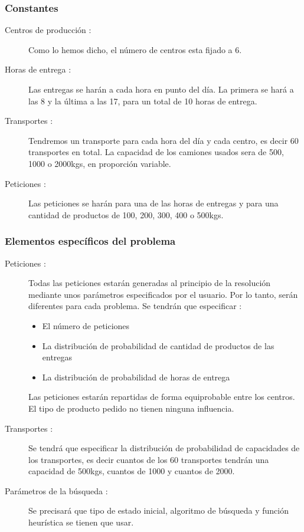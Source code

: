 \documentclass{article}
\begin{document}
\subsubsection{Constantes}
\begin{description}
\item[Centros de producción :] Como lo hemos dicho, el número de centros esta 
fijado a 6.
\item[Horas de entrega :] Las entregas se harán a cada hora en punto del día. La
primera se hará a las 8 y la última a las 17, para un total de 10 horas de
entrega.
\item[Transportes :] Tendremos un transporte para cada hora del día y cada
centro, es decir 60 transportes en total. La capacidad de los camiones usados
sera de 500, 1000 o 2000kgs, en proporción variable.
\item[Peticiones :] Las peticiones se harán para una de las horas de entregas y
para una cantidad de productos de 100, 200, 300, 400 o 500kgs.
\end{description}

\subsubsection{Elementos específicos del problema}
\begin{description}
\item[Peticiones :] Todas las peticiones estarán generadas al principio de la
resolución mediante unos parámetros especificados por el usuario. Por lo tanto,
serán diferentes para cada problema. Se tendrán que especificar :
\begin{itemize}
\item El número de peticiones
\item La distribución de probabilidad de cantidad de productos de las entregas
\item La distribución de probabilidad de horas de entrega
\end{itemize}
Las peticiones estarán repartidas de forma equiprobable entre los centros.
El tipo de producto pedido no tienen ninguna influencia.
\item[Transportes :] Se tendrá que especificar la distribución de probabilidad
de capacidades de los transportes, es decir cuantos de los 60 transportes
tendrán una capacidad de 500kgs, cuantos de 1000 y cuantos de 2000.
\item[Parámetros de la búsqueda :] Se precisará que tipo de estado inicial,
algoritmo de búsqueda y función heurística se tienen que usar. 
\end{description}
\end{document}
